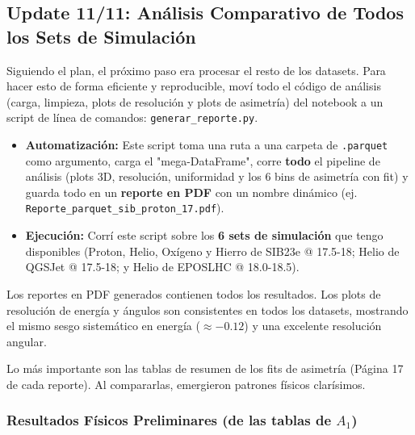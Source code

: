 \subsection*{Update 11/11: Análisis Comparativo de Todos los Sets de Simulación}

Siguiendo el plan, el próximo paso era procesar el resto de los datasets. Para hacer esto de forma eficiente y reproducible, moví todo el código de análisis (carga, limpieza, plots de resolución y plots de asimetría) del notebook a un script de línea de comandos: \lstinline|generar_reporte.py|.

\begin{itemize}
	\item \textbf{Automatización:} Este script toma una ruta a una carpeta de \lstinline|.parquet| como argumento, carga el "mega-DataFrame", corre \textbf{todo} el pipeline de análisis (plots 3D, resolución, uniformidad y los 6 bins de asimetría con fit) y guarda todo en un \textbf{reporte en PDF} con un nombre dinámico (ej. \lstinline|Reporte_parquet_sib_proton_17.pdf|).
	
	\item \textbf{Ejecución:} Corrí este script sobre los \textbf{6 sets de simulación} que tengo disponibles (Proton, Helio, Oxígeno y Hierro de SIB23e @ 17.5-18; Helio de QGSJet @ 17.5-18; y Helio de EPOSLHC @ 18.0-18.5).
\end{itemize}

Los reportes en PDF generados contienen todos los resultados. Los plots de resolución de energía y ángulos son consistentes en todos los datasets, mostrando el mismo sesgo sistemático en energía ($\approx -0.12$) y una excelente resolución angular.

Lo más importante son las tablas de resumen de los fits de asimetría (Página 17 de cada reporte). Al compararlas, emergieron patrones físicos clarísimos.

\subsubsection*{Resultados Físicos Preliminares (de las tablas de $A_1$)}

